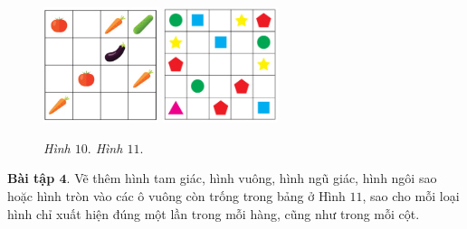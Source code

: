 		\begin{figure}[H]
		\vspace*{-5pt}
		\centering
		\captionsetup{labelformat=empty, justification=centering}
		\includegraphics[width=0.3\textwidth]{hinh11}\hspace{40pt}
		\includegraphics[width=0.3\textwidth]{hinh13}
		
		\caption{\textit{\small Hình $10.$ \hspace*{75pt} Hình $11.$ }}  %
		\vspace*{-10pt}
	\end{figure}
	\textbf{\color{toancuabi}Bài tập $\pmb{4.}$} Vẽ thêm  hình tam giác, hình vuông,  hình ngũ giác, hình ngôi sao hoặc hình tròn vào các ô vuông còn trống trong bảng ở Hình $11$, sao cho mỗi loại hình chỉ xuất hiện đúng một lần trong mỗi hàng, cũng như trong mỗi cột.